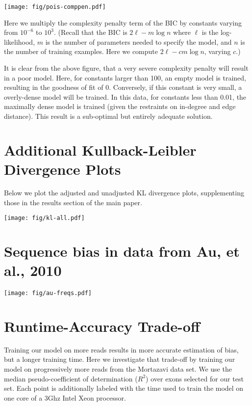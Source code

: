 \documentclass[letterpaper]{article}
\begin{document}
\begin{center}
\texttt{[image: fig/pois-comppen.pdf]}
\end{center}

Here we multiply the complexity penalty term of the BIC by constants varying
from $10^{-6}$ to $10^{3}$. (Recall that the BIC is $2\ell - m \log n$ where
$\ell$ is the log-likelihood, $m$ is the number of parameters needed to specify
the model, and $n$ is the number of training examples. Here we compute $2 \ell -
c m \log n$, varying $c$.)

It is clear from the above figure, that a very severe complexity penalty will
result in a poor model. Here, for constants larger than 100, an empty model is
trained, resulting in the goodness of fit of 0. Conversely, if this constant is
very small, a overly-dense model will be trained.  In this data, for constants
less than 0.01, the maximally dense model is trained (given the restraints on
in-degree and edge distance). This result is a sub-optimal but entirely adequate
solution.


\section{Additional Kullback-Leibler Divergence Plots}

Below we plot the adjusted and unadjusted KL divergence plots, supplementing
those in the results section of the main paper.


\texttt{[image: fig/kl-all.pdf]}

\section{Sequence bias in data from Au, et al., 2010}

\centerline{\texttt{[image: fig/au-freqs.pdf]}}


\section{Runtime-Accuracy Trade-off}

Training our model on more reads results in more accurate estimation of bias,
but a longer training time. Here we investigate that trade-off by training our
model on progressively more reads from the Mortazavi data set. We use the
median pseudo-coefficient of determination ($R^2$) over exons selected for our
test set. Each point is additionally labeled with the time used to train the
model on one core of a 3Ghz Intel Xeon processor.
\end{document}
